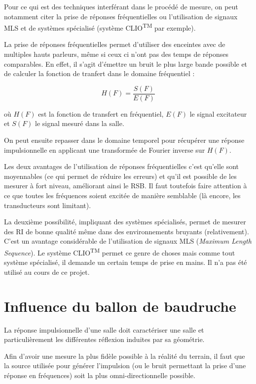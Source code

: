 Pour ce qui est des techniques interférant dans le procédé de mesure, on peut notamment citer la prise de réponses
fréquentielles ou l'utilisation de signaux MLS et de systèmes spécialisé (système CLIO\textsuperscript{\textsc{TM}} par
exemple).

La prise de réponses fréquentielles permet d'utiliser des enceintes avec de multiples hauts parleurs, même si ceux ci
n'ont pas des temps de réponses comparables. En effet, il s'agit d'émettre un bruit le plus large bande possible et de
calculer la fonction de tranfert dans le domaine fréquentiel :

$$H(F) = \frac{S(F)}{E(F)}$$

où $H(F)$ est la fonction de transfert en fréquentiel, $E(F)$ le signal excitateur et $S(F)$ le signal mesuré dans la
salle.

On peut ensuite repasser dans le domaine temporel pour récupérer une réponse impulsionnelle en applicant une transformée
de Fourier inverse sur $H(F)$.

Les deux avantages de l'utilisation de réponses fréquentielles c'est qu'elle sont moyennables (ce qui permet de réduire
les erreurs) et qu'il est possible de les mesurer à fort niveau, améliorant ainsi le RSB. Il faut toutefois faire
attention à ce que toutes les fréquences soient excitée de manière semblable (là encore, les transducteurs sont
limitant).

La deuxième possibilité, impliquant des systèmes spécialisés, permet de mesurer des RI de bonne qualité même dans des
environnements bruyants (relativement). C'est un avantage considérable de l'utilisation de signaux MLS (\textit{Maximum
Length Sequence}). Le système CLIO\textsuperscript{\textsc{TM}} permet ce genre de choses mais comme tout système
spécialisé, il demande un certain temps de prise en mains. Il n'a pas été utilisé au cours de ce projet.

\section{Influence du ballon de baudruche} %



La réponse impulsionnelle d'une salle doit caractériser une salle et particulièrement les différentes réflexion induites
par sa géométrie.

Afin d'avoir une mesure la plus fidèle possible à la réalité du terrain, il faut que la source utilisée pour générer
l'impulsion (ou le bruit permettant la prise d'une réponse en fréquences) soit la plus omni-directionnelle possible.


